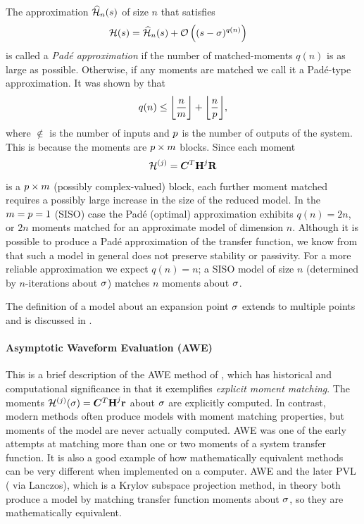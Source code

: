  The approximation $\widehat{\mathcal{H}}_n(s)$ of size $n$ that satisfies
        \begin{align}
                \mathcal{H}(s) &= \widehat{\mathcal{H}}_n(s) + \mathcal{O}\left( (s-\sigma )^{q(n)} \right)
                \label{eq:pade}
        \end{align}
        is called a  \emph{Pad\'{e}  approximation} if the number of matched-moments $q(n)$ is as large as possible. Otherwise, if any moments are matched we 
        call it a Pad\'{e}-type approximation.  It was shown by \cite{AN} that 
\begin{equation}
	q(n) \leq \bigg\lfloor \frac{n}{m} \bigg\rfloor + \bigg\lfloor \frac{n}{p} \bigg\rfloor,
\label{eq:pade_bound}
\end{equation}
where $\nin$ is the number of inputs and $p$ is the number of outputs of the system.  This is because the moments are $p \times m$ blocks.  Since each moment 
\[
\mathcal{H}^{(j)} = \bm{C}^T \textbf{\textup{H}}^j \textbf{\textup{R}}
\]
is a  $p \times m$ (possibly complex-valued) block, each further moment matched requires a possibly large increase in the size of the reduced model.  In the $m=p=1$ (SISO) case the  Pad\'{e}  (optimal) approximation exhibits $q(n)= 2n$, or $2n$ moments matched for an approximate model of dimension $n$.    
        Although it is possible to produce a Pad\'{e}
        approximation of the transfer function, we know from \cite{AN} 
        that such a model in general does not preserve stability or passivity.  
        For a more reliable approximation we expect $q(n)=n$; a SISO model of size $n$ (determined by $n$-iterations about $\sigma$) matches $n$ moments about $\sigma$.

The definition of a \pade{} model about an expansion point $\sigma$ extends to multiple points and is discussed in \cite{multipoint_pade}.


\paragraph{Asymptotic Waveform Evaluation (AWE)}
This is a brief description of the AWE  method of \cite{AWE}, which has historical and computational significance in that it exemplifies \emph{explicit moment matching}.  The moments $\mathcal{H}^{(j)}(\sigma) = \bm{C}^T \textbf{\textup{H}}^j \textbf{\textup{r}}$ about $\sigma$ are explicitly computed.   In contrast, modern methods often produce models with moment matching properties, but moments of the model are never actually computed. AWE was one of the early attempts at matching more than one or two moments of a system transfer function.  It is also a good example of how mathematically equivalent methods can be very different when implemented on a computer.   AWE and the later PVL (\pade{} via Lanczos), which is a Krylov subspace projection method, in theory both produce a \pade{} model by matching transfer function moments about $\sigma$, so they are mathematically equivalent.

